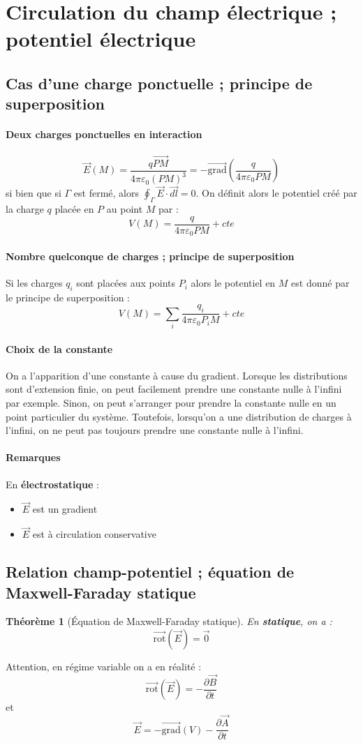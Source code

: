 \documentclass[french]{book}
\theoremstyle{plain}
\newtheorem{thm}{Théorème}
\theoremstyle{definition}
\theoremstyle{remark}
\newcommand{\grad}{\overrightarrow{\text{grad}}}
\newcommand{\rot}{\overrightarrow{\text{rot}}}
\begin{document}
\section{Circulation du champ électrique ; potentiel électrique}
\subsection{Cas d'une charge ponctuelle ; principe de superposition}
\paragraph{Deux charges ponctuelles en interaction}
$$\overrightarrow{E}(M)=\frac{q\overrightarrow{PM}}{4\pi\varepsilon_0(PM)^3}=-\grad\left(\frac{q}{4\pi\varepsilon_0 PM}\right)$$ si bien que si $\Gamma$ est fermé, alors $\displaystyle\oint_\Gamma\overrightarrow{E}\cdot\overrightarrow{dl}=0$. On définit alors le potentiel créé par la charge $q$ placée en $P$ au point $M$ par : $$V(M)=\frac{q}{4\pi\varepsilon_0 PM}+cte$$
\paragraph{Nombre quelconque de charges ; principe de superposition}
Si les charges $q_i$ sont placées aux points $P_i$ alors le potentiel en $M$ est donné par le principe de superposition : $$V(M)=\sum_i\frac{q_i}{4\pi\varepsilon_0 P_iM}+cte$$
\paragraph{Choix de la constante}
On a l'apparition d'une constante à cause du gradient. Lorsque les distributions sont d'extension finie, on peut facilement prendre une constante nulle à l'infini par exemple. Sinon, on peut s'arranger pour prendre la constante nulle en un point particulier du système. Toutefois, lorsqu'on a une distribution de charges à l'infini, on ne peut pas toujours prendre une constante nulle à l'infini.
\paragraph{Remarques}
En \textbf{électrostatique} :
\begin{itemize}
	\item $\overrightarrow{E}$ est un gradient
	\item $\overrightarrow{E}$ est à circulation conservative
\end{itemize} 
\subsection{Relation champ-potentiel ; équation de Maxwell-Faraday statique}
\begin{thm}[Équation de Maxwell-Faraday statique]
	En \textbf{statique}, on a : $$\rot(\overrightarrow{E})=\overrightarrow{0}$$
\end{thm}
Attention, en régime variable on a en réalité : $$\rot(\overrightarrow{E})=-\frac{\partial\overrightarrow{B}}{\partial t}$$ et $$\overrightarrow{E}=-\grad(V)-\frac{\partial \overrightarrow{A}}{\partial t}$$
\end{document}
